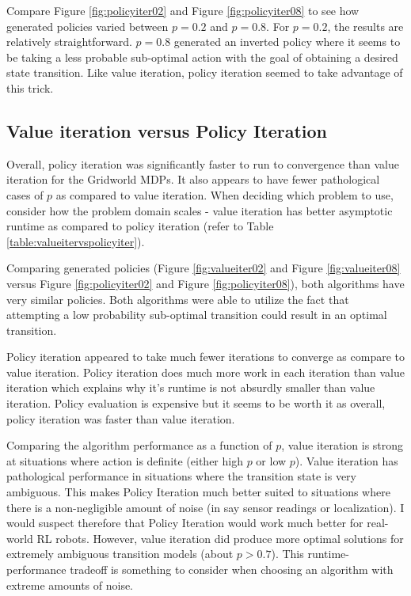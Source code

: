 \documentclass[11pt]{article}
\begin{document}
Compare Figure \ref{fig:policyiter02} and Figure \ref{fig:policyiter08} to see how generated policies varied between $p=0.2$ and $p=0.8$. For $p=0.2$, the results are relatively straightforward. $p=0.8$ generated an inverted policy where it seems to be taking a less probable sub-optimal action with the goal of obtaining a desired state transition. Like value iteration, policy iteration seemed to take advantage of this trick.


\subsection{Value iteration versus Policy Iteration}

Overall, policy iteration was significantly faster to run to convergence than value iteration for the Gridworld MDPs. It also appears to have fewer pathological cases of $p$ as compared to value iteration. When deciding which problem to use, consider how the problem domain scales - value iteration has better asymptotic runtime as compared to policy iteration (refer to Table \ref{table:valueitervspolicyiter}).



Comparing generated policies (Figure \ref{fig:valueiter02} and Figure \ref{fig:valueiter08} versus Figure \ref{fig:policyiter02} and Figure \ref{fig:policyiter08}), both algorithms have very similar policies. Both algorithms were able to utilize the fact that attempting a low probability sub-optimal transition could result in an optimal transition.

Policy iteration appeared to take much fewer iterations to converge as compare to value iteration. Policy iteration does much more work in each iteration than value iteration which explains why it's runtime is not absurdly smaller than value iteration. Policy evaluation is expensive but it seems to be worth it as overall, policy iteration was faster than value iteration.

Comparing the algorithm performance as a function of $p$, value iteration is strong at situations where action is definite (either high $p$ or low $p$). Value iteration has pathological performance in situations where the transition state is very ambiguous. This makes Policy Iteration much better suited to situations where there is a non-negligible amount of noise (in say sensor readings or localization). I would suspect therefore that Policy Iteration would work much better for real-world RL robots. However, value iteration did produce more optimal solutions for extremely ambiguous transition models (about $p \gt 0.7$). This runtime-performance tradeoff is something to consider when choosing an algorithm with extreme amounts of noise.
\end{document}

